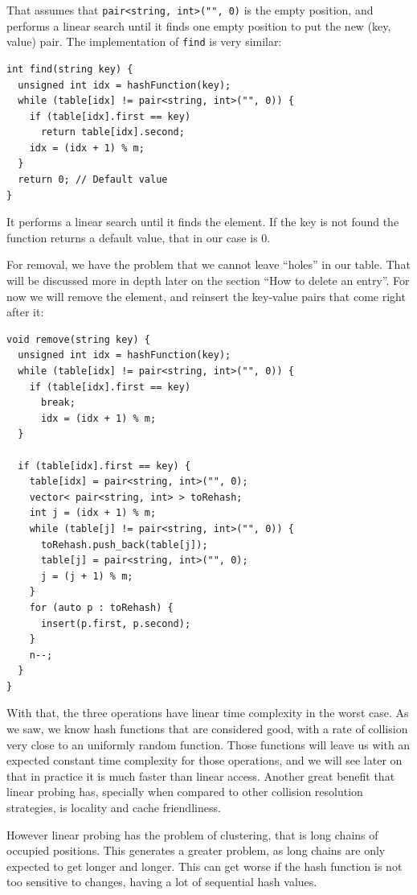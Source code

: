 That assumes that \texttt{pair<string, int>("", 0)} is the empty position, and performs a linear search until it finds one empty position to put the new (key, value) pair. The implementation of \texttt{find} is very similar:

\newpage

\begin{lstlisting}
int find(string key) {
  unsigned int idx = hashFunction(key);
  while (table[idx] != pair<string, int>("", 0)) {
    if (table[idx].first == key) 
      return table[idx].second;
    idx = (idx + 1) % m;
  }
  return 0; // Default value
}
\end{lstlisting}

It performs a linear search until it finds the element. If the key is not found the function returns a default value, that in our case is 0. 

For removal, we have the problem that we cannot leave ``holes'' in our table. That will be discussed more in depth later on the section ``How to delete an entry''. For now we will remove the element, and reinsert the key-value pairs that come right after it:

\begin{lstlisting}
void remove(string key) {
  unsigned int idx = hashFunction(key);
  while (table[idx] != pair<string, int>("", 0)) {
    if (table[idx].first == key) 
      break;
      idx = (idx + 1) % m;
  }
    
  if (table[idx].first == key) {
    table[idx] = pair<string, int>("", 0);
    vector< pair<string, int> > toRehash;
    int j = (idx + 1) % m;
    while (table[j] != pair<string, int>("", 0)) {
      toRehash.push_back(table[j]);
      table[j] = pair<string, int>("", 0);
      j = (j + 1) % m;
    }
    for (auto p : toRehash) {
      insert(p.first, p.second);
    }
    n--;
  }  
}
\end{lstlisting}

With that, the three operations have linear time complexity in the worst case. As we saw, we know hash functions that are considered good, with a rate of collision very close to an uniformly random function. Those functions will leave us with an expected constant time complexity for those operations, and we will see later on that in practice it is much faster than linear access. Another great benefit that linear probing has, specially when compared to other collision resolution strategies, is locality and cache friendliness.

However linear probing has the problem of clustering, that is long chains of occupied positions. This generates a greater problem, as long chains are only expected to get longer and longer. This can get worse if the hash function is not too sensitive to changes, having a lot of sequential hash values. 

